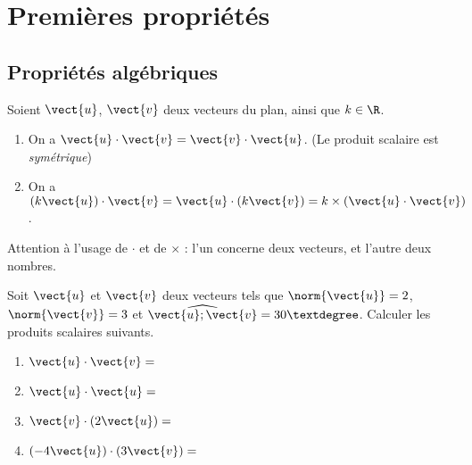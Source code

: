 \documentclass{article}
\begin{document}
\section{Premières propriétés}
\subsection{Propriétés algébriques}
\begin{proposition}
Soient $\vect{u}$, $\vect{v}$ deux vecteurs du plan, ainsi que $k \in \R$.
\begin{enumerate}
\item On a $\vect{u} \cdot \vect{v} = \vect{v} \cdot \vect{u}$. (Le produit scalaire est \emph{symétrique})
\item On a $(k\vect{u}) \cdot \vect{v} = \vect{u} \cdot (k\vect{v}) = k \times (\vect{u} \cdot \vect{v})$.
\end{enumerate}
\end{proposition}
\begin{remark}
Attention à l'usage de $\cdot$ et de $\times$ : l'un concerne deux vecteurs, et l'autre deux nombres.
\end{remark}
\emptybox{2.5cm}
\begin{example}
Soit $\vect{u}$ et $\vect{v}$ deux vecteurs tels que $\norm{\vect{u}} = 2$, $\norm{\vect{v}} = 3$ et $\widehat{\vect{u};\vect{v}} = 30°$. Calculer les produits scalaires suivants.
\begin{enumerate}[label=\emph{\alph*)}]
\item $\vect{u} \cdot \vect{v} = $\answersline
\item $\vect{u} \cdot \vect{u} =$\answersline
\item $\vect{v} \cdot (2\vect{u}) =$\answersline
\item $(-4\vect{u}) \cdot (3\vect{v}) = $\answersline
\end{enumerate}
\end{example}
\end{document}
